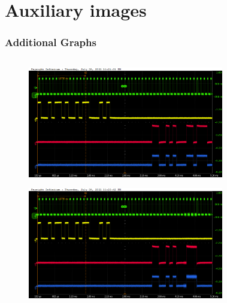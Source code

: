 \documentclass[aspectratio=169]{beamer}
\begin{document}
	\section{Auxiliary images}
	
	\begin{frame}
	\frametitle{Additional Graphs}
	\begin{columns}
		\begin{center}
			\begin{figure}
				\includegraphics[width=0.95 \textwidth]{IMG/probe/09-08-2021_ch05-read55-baselinedac1.png}
				\caption{}
			\end{figure}
			\begin{figure}
				\includegraphics[width=0.95 \textwidth]{IMG/probe/09-08-2021_ch05-read56-baselinedac1.png}
				\caption{}
			\end{figure}		
		\end{center}
		\begin{center}
			\begin{figure}

\end{figure}
\end{center}
\end{columns}
\end{frame}
\end{document}
